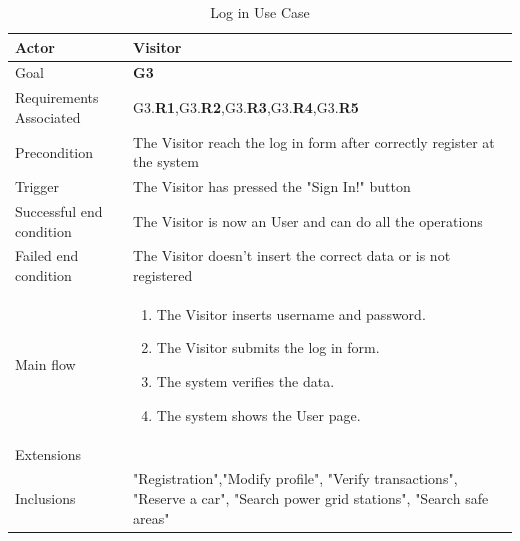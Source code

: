 \newline
\begin{table}[htb]
\begin{center}
\renewcommand{\arraystretch}{1.5}
\begin{tabular}{|l|p{}|}
\hline
Actor & Visitor \\ \hline
Goal & \textbf{G3} \\ \hline
Requirements Associated & G3.\textbf{R1},G3.\textbf{R2},G3.\textbf{R3},G3.\textbf{R4},G3.\textbf{R5} \\ \hline
Precondition & The Visitor reach the log in form after correctly register at the system \\ \hline
Trigger & The Visitor has pressed the "Sign In!" button \\ \hline
Successful end condition & The Visitor is now an User and can do all the operations \\ \hline
Failed end condition & The Visitor doesn't insert the correct data or is not registered \\ \hline
Main flow & \begin{minipage}[t]{0.6\textwidth}
\begin{enumerate}
\addtolength{\itemindent}{0.5cm}
\item The Visitor inserts username and password.
\item The Visitor submits the log in form.
\item The system verifies the data.
\item The system shows the User page.
\end{enumerate}
\end{minipage} \\ \hline
Extensions & \\ \hline
Inclusions & "Registration","Modify profile", "Verify transactions", "Reserve a car", "Search power grid stations", "Search safe areas"  \\ \hline
\end{tabular}
\caption{Log in Use Case}
\end{center}
\end{table}
\clearpage

